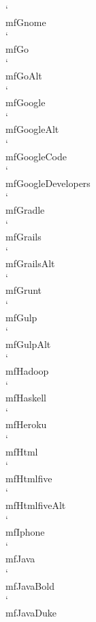 \documentclass[parskip=half, twocolumn, 13pt]{scrartcl}
\begin{document}
\mfGnome \quad \char`\\mfGnome \\
\mfGo \quad \char`\\mfGo \\
\mfGoAlt \quad \char`\\mfGoAlt \\
\mfGoogle \quad \char`\\mfGoogle \\
\mfGoogleAlt \quad \char`\\mfGoogleAlt \\
\mfGoogleCode \quad \char`\\mfGoogleCode \\
\mfGoogleDevelopers \quad \char`\\mfGoogleDevelopers \\
\mfGradle \quad \char`\\mfGradle \\
\mfGrails \quad \char`\\mfGrails \\
\mfGrailsAlt \quad \char`\\mfGrailsAlt \\
\mfGrunt \quad \char`\\mfGrunt \\
\mfGulp \quad \char`\\mfGulp \\
\mfGulpAlt \quad \char`\\mfGulpAlt \\
\mfHadoop \quad \char`\\mfHadoop \\
\mfHaskell \quad \char`\\mfHaskell \\
\mfHeroku \quad \char`\\mfHeroku \\
\mfHtml \quad \char`\\mfHtml \\
\mfHtmlfive \quad \char`\\mfHtmlfive \\
\mfHtmlfiveAlt \quad \char`\\mfHtmlfiveAlt \\
\mfIphone \quad \char`\\mfIphone \\
\mfJava \quad \char`\\mfJava \\
\mfJavaBold \quad \char`\\mfJavaBold \\
\mfJavaDuke \quad \char`\\mfJavaDuke \\
\end{document}
